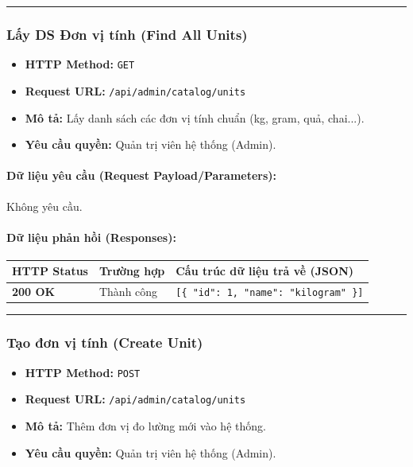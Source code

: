 \documentclass[12pt,a4paper]{article}
\begin{document}
\vskip 0.4cm
\noindent\rule{\textwidth}{0.3pt}
\vskip 0.4cm

\subsubsection{Lấy DS Đơn vị tính (Find All Units)}
\begin{itemize}[leftmargin=*]
    \item \textbf{HTTP Method:} \texttt{GET}
    \item \textbf{Request URL:} \texttt{/api/admin/catalog/units}
    \item \textbf{Mô tả:} Lấy danh sách các đơn vị tính chuẩn (kg, gram, quả, chai...).
    \item \textbf{Yêu cầu quyền:} Quản trị viên hệ thống (Admin).
\end{itemize}

\paragraph{Dữ liệu yêu cầu (Request Payload/Parameters):}
Không yêu cầu.\\

\paragraph{Dữ liệu phản hồi (Responses):}
\begin{longtable}{|p{2.8cm}|p{3.2cm}|p{8.0cm}|}
\hline
\textbf{HTTP Status} & \textbf{Trường hợp} & \textbf{Cấu trúc dữ liệu trả về (JSON)} \\ \hline
\endhead
\textbf{200 OK} & Thành công & \texttt{[\{ "id": 1, "name": "kilogram" \}]} \\ \hline
\end{longtable}

\vskip 0.4cm
\noindent\rule{\textwidth}{0.3pt}
\vskip 0.4cm

\subsubsection{Tạo đơn vị tính (Create Unit)}
\begin{itemize}[leftmargin=*]
    \item \textbf{HTTP Method:} \texttt{POST}
    \item \textbf{Request URL:} \texttt{/api/admin/catalog/units}
    \item \textbf{Mô tả:} Thêm đơn vị đo lường mới vào hệ thống.
    \item \textbf{Yêu cầu quyền:} Quản trị viên hệ thống (Admin).
\end{itemize}
\end{document}
